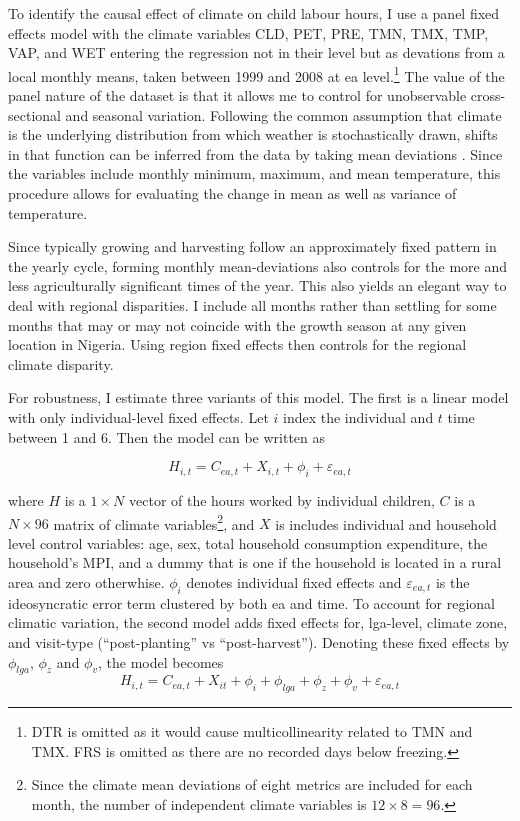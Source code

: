 \documentclass[a4paper,12pt]{article}
\theoremstyle{plain}
\theoremstyle{definition}
\theoremstyle{definition}
\theoremstyle{definition}
\theoremstyle{definition}
\begin{document}
To identify the causal effect of climate on child labour hours, I use a panel fixed effects model with the climate variables CLD, PET, PRE, TMN, TMX, TMP, VAP, and WET entering the regression not in their level but as devations from a local monthly means, taken between 1999 and 2008 at ea level.\footnote{DTR is omitted as it would cause multicollinearity related to TMN and TMX. FRS is omitted as there are no recorded days below freezing.} The value of the panel nature of the dataset is that it allows me to control for unobservable cross-sectional and seasonal variation. Following the common assumption that climate is the underlying distribution from which weather is stochastically drawn, shifts in that function can be inferred from the data by taking mean deviations \citet{Auffhammer2013,Hsiang2016a, Hsiang2018}. Since the variables include monthly minimum, maximum, and mean temperature, this procedure allows for evaluating the change in mean as well as variance of temperature.

Since typically growing and harvesting follow an approximately fixed pattern in the yearly cycle, forming monthly mean-deviations also controls for the more and less agriculturally significant times of the year. This also yields an elegant way to deal with regional disparities. I include all months rather than settling for some months that may or may not coincide with the growth season at any given location in Nigeria. Using region fixed effects then controls for the regional climate disparity.

For robustness, I estimate three variants of this model. The first is a linear model with only individual-level fixed effects. Let $i$ index the individual and $t$ time between 1 and 6. Then the model can be written as

\begin{equation}
    H_{i,t}= C_{ea,t} + X_{i,t} + \phi_i + \varepsilon_{ea,t}
\end{equation}

where $H$ is a $1\times N$ vector of the hours worked by individual children, $C$ is a $N\times96$ matrix of climate variables\footnote{Since the climate mean deviations of eight metrics are included for each month, the number of independent climate variables is $12\times8=96$.}, and $X$ is includes individual and household level control variables: age, sex, total household consumption expenditure, the household's MPI, and a dummy that is one if the household is located in a rural area and zero otherwhise. $\phi_{i}$ denotes individual fixed effects and $\varepsilon_{ea,t}$ is the ideosyncratic error term clustered by both ea and time. To account for regional climatic variation, the second model adds fixed effects for, lga-level, climate zone, and visit-type (``post-planting'' vs ``post-harvest''). Denoting these fixed effects by $\phi_{lga}$, $\phi_z$ and $\phi_v$, the model becomes
\begin{equation}
    H_{i,t}= C_{ea,t} + X_{it} + \phi_i + \phi_{lga} + \phi_z + \phi_v + \varepsilon_{ea,t}
\end{equation}
\end{document}
